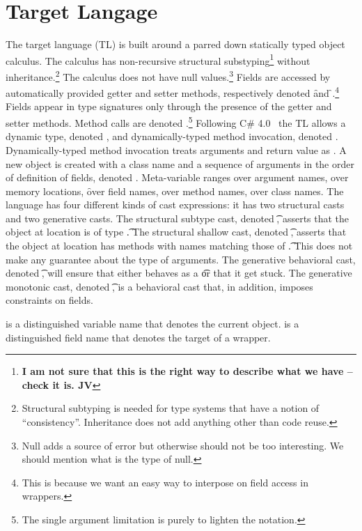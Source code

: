 \documentclass[a4paper,UKenglish,final]{tex/lipics-v2016}
\begin{document}
\section*{Target Langage}

The target language (TL) is built around a parred down statically typed
object calculus. The calculus has non-recursive structural
substyping\footnote{\bf I am not sure that this is the right way to describe
  what we have -- check it is. JV} without inheritance.\footnote{Structural
  subtyping is needed for type systems that have a notion of
  ``consistency''. Inheritance does not add anything other than code reuse.}
The calculus does not have null values.\footnote{Null adds a source of error
  but otherwise should not be too interesting. We should mention what is the
  type of null.} Fields are accessed by automatically provided getter and
setter methods, respectively denoted \Get\x\f and \Set\x\f\e.\footnote{This
  is because we want an easy way to interpose on field access in wrappers.}
Fields appear in type signatures only through the presence of the getter and
setter methods. Method calls are denoted \Call\x\m\e.\footnote{The single
  argument limitation is purely to lighten the notation.} Following C\#
4.0~\cite{} the TL allows a dynamic type, denoted \any, and
dynamically-typed method invocation, denoted
\DynCall\x\m\e. Dynamically-typed method invocation treats arguments and
return value as \any. A new object is created with a class name and a
sequence of arguments in the order of definition of fields, denoted
\New\C{\b\e}.  Meta-variable \x ranges over argument names, \a over memory
locations, \f over field names, \m over method names, \C over class
names. The language has four different kinds of cast expressions: it has two
structural casts and two generative casts. The structural subtype cast,
denoted \SubCast\t\a, asserts that the object at location \a is of type
\t.  The structural shallow cast, denoted \ShaCast\t\a, asserts that the
object at location \a has methods with names matching those of \t. This does
not make any guarantee about the type of arguments.  The generative
behavioral cast, denoted \BehCast\t\a, will ensure that either \a behaves
as a \t or that it get stuck. The generative monotonic cast, denoted
\MonCast\t\a, is a behavioral cast that, in addition, imposes constraints
on fields.

\this is a distinguished variable name that denotes the current object.
\that is a distinguished field name that denotes the target of a wrapper.
\end{document}
